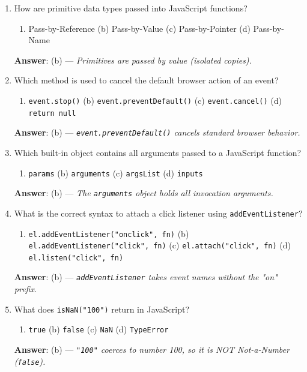 \begin{enumerate}[leftmargin=1.5em]
    \item How are primitive data types passed into JavaScript functions?
    \begin{enumerate}[label=(\alph*)]
        \item Pass-by-Reference \quad (b) Pass-by-Value \quad (c) Pass-by-Pointer \quad (d) Pass-by-Name
    \end{enumerate}
    \textbf{Answer}: (b) --- \textit{Primitives are passed by value (isolated copies).}

    \item Which method is used to cancel the default browser action of an event?
    \begin{enumerate}[label=(\alph*)]
        \item \texttt{event.stop()} \quad (b) \texttt{event.preventDefault()} \quad (c) \texttt{event.cancel()} \quad (d) \texttt{return null}
    \end{enumerate}
    \textbf{Answer}: (b) --- \textit{\texttt{event.preventDefault()} cancels standard browser behavior.}

    \item Which built-in object contains all arguments passed to a JavaScript function?
    \begin{enumerate}[label=(\alph*)]
        \item \texttt{params} \quad (b) \texttt{arguments} \quad (c) \texttt{argsList} \quad (d) \texttt{inputs}
    \end{enumerate}
    \textbf{Answer}: (b) --- \textit{The \texttt{arguments} object holds all invocation arguments.}

    \item What is the correct syntax to attach a click listener using \texttt{addEventListener}?
    \begin{enumerate}[label=(\alph*)]
        \item \texttt{el.addEventListener("onclick", fn)} \quad (b) \texttt{el.addEventListener("click", fn)} \quad (c) \texttt{el.attach("click", fn)} \quad (d) \texttt{el.listen("click", fn)}
    \end{enumerate}
    \textbf{Answer}: (b) --- \textit{\texttt{addEventListener} takes event names without the "on" prefix.}

    \item What does \texttt{isNaN("100")} return in JavaScript?
    \begin{enumerate}[label=(\alph*)]
        \item \texttt{true} \quad (b) \texttt{false} \quad (c) \texttt{NaN} \quad (d) \texttt{TypeError}
    \end{enumerate}
    \textbf{Answer}: (b) --- \textit{\texttt{"100"} coerces to number 100, so it is NOT Not-a-Number (\texttt{false}).}


\end{enumerate}
